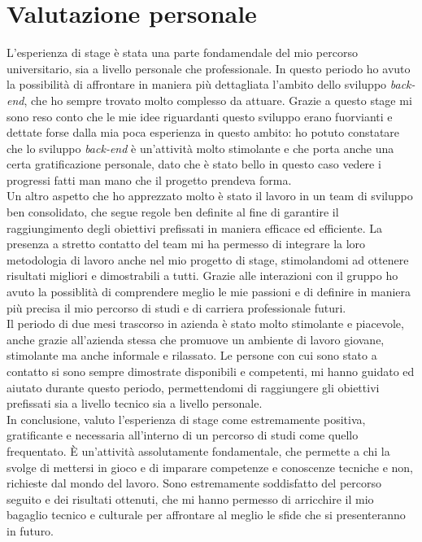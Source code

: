 \section{Valutazione personale}

L'esperienza di stage è stata una parte fondamendale del mio percorso
universitario, sia a livello personale che professionale. In questo periodo ho
avuto la possibilità di affrontare in maniera più dettagliata l'ambito dello sviluppo
\emph{back-end}, che ho sempre trovato molto complesso da attuare. Grazie a
questo stage mi sono reso conto che le mie idee riguardanti questo sviluppo
erano fuorvianti e dettate forse dalla mia poca esperienza in questo ambito: ho
potuto constatare che lo sviluppo \emph{back-end} è un'attività molto stimolante
e che porta anche una certa gratificazione personale, dato che è stato bello in
questo caso vedere i progressi fatti man mano che il progetto prendeva forma.\\
Un altro aspetto che ho apprezzato molto è stato il lavoro in un team di
sviluppo ben consolidato, che segue regole ben definite al fine di garantire il
raggiungimento degli obiettivi prefissati in maniera efficace ed efficiente. La
presenza a stretto contatto del team mi ha permesso di integrare la loro
metodologia di lavoro anche nel mio progetto di stage, stimolandomi ad ottenere
risultati migliori e dimostrabili a tutti. Grazie alle interazioni con il gruppo
ho avuto la possiblità di comprendere meglio le mie passioni e di definire in
maniera più precisa il mio percorso di studi e di carriera professionale
futuri.\\
Il periodo di due mesi trascorso in azienda è stato molto stimolante e
piacevole, anche grazie all'azienda stessa che promuove un ambiente di lavoro
giovane, stimolante ma anche informale e rilassato. Le persone con cui sono
stato a contatto si sono sempre dimostrate disponibili e competenti, mi hanno
guidato ed aiutato durante questo periodo, permettendomi di raggiungere gli
obiettivi prefissati sia a livello tecnico sia a livello personale.\\
In conclusione, valuto l'esperienza di stage come estremamente positiva, gratificante e
necessaria all'interno di un percorso di studi come quello frequentato. È
un'attività assolutamente fondamentale, che permette a chi la svolge di mettersi
in gioco e di imparare competenze e conoscenze tecniche e non, richieste dal
mondo del lavoro. Sono estremamente soddisfatto del percorso seguito e dei
risultati ottenuti, che mi hanno permesso di arricchire il mio bagaglio tecnico
e culturale per affrontare al meglio le sfide che si presenteranno in futuro.